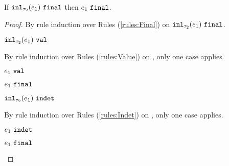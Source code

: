 \begin{lemma}
  \label{lem:inl-final}
  If $\mathtt{inl}_{\tau_2}({e_1}) ~\mathtt{final}$ then $e_1 ~\mathtt{final}$.
\end{lemma}
\begin{proof}
By rule induction over Rules (\ref{rules:Final}) on $\mathtt{inl}_{\tau_2}({e_1}) ~\mathtt{final}$.
\begin{byCases}
\item[\text{(\ref{rule:FVal})}]
    \begin{pfsteps*}
    \item $\mathtt{inl}_{\tau_2}({e_1}) ~\mathtt{val}$  
    \end{pfsteps*}
    By rule induction over Rules (\ref{rules:Value}) on , only one case applies.
    \begin{byCases}
    \item[\text{(\ref{rule:VInl})}]
        \begin{pfsteps*}
        \item $e_1 ~\mathtt{val}$  
        \item $e_1 ~\mathtt{final}$ 
        \end{pfsteps*}
    \end{byCases}
\item[\text{(\ref{rule:FIndet})}]
    \begin{pfsteps*}
    \item $\mathtt{inl}_{\tau_2}({e_1}) ~\mathtt{indet}$  
    \end{pfsteps*}
    By rule induction over Rules (\ref{rules:Indet}) on , only one case applies.
    \begin{byCases}
    \item[\text{(\ref{rule:IInl})}]
        \begin{pfsteps*}
        \item $e_1 ~\mathtt{indet}$  
        \item $e_1 ~\mathtt{final}$ 
        \end{pfsteps*}
    \end{byCases}
\end{byCases}
\resetpfcounter
\end{proof}

